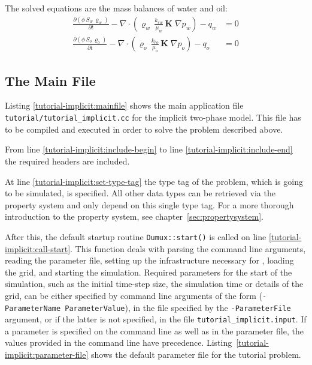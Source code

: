 The solved equations are the mass balances of water and oil:
\begin{align}
  \label{massbalancewater}
  \frac {\partial (\phi \, S_{w}\, \varrho_{w})}{\partial t}
  -
  \nabla \cdot \left( \varrho_{w} \, \frac{k_{rw}}{\mu_{w}} \, \mathbf{K}\;\nabla p_w \right)
  -
  q_w
  & =
  0 \\
  \label{massbalanceoil}
  \frac {\partial (\phi \, S_{o}\, \varrho_{o})}{\partial t}
  -
  \nabla \cdot \left( \varrho_{o} \, \frac{k_{ro}}{\mu_{o}} \, \mathbf{K}\;\nabla p_o \right)
  -
  q_o
  & =
  0
\end{align}

\subsection{The Main File}
Listing \ref{tutorial-implicit:mainfile} shows the main application file
\texttt{tutorial/tutorial\_implicit.cc} for the implicit two-phase
model. This file has to be compiled and executed in order to solve the problem described
above.

\begin{lst}\label{tutorial-implicit:mainfile} \mbox{}
  
\end{lst}

From line \ref{tutorial-implicit:include-begin} to line
\ref{tutorial-implicit:include-end} the required headers are included.

At line \ref{tutorial-implicit:set-type-tag} the type tag of the
problem, which is going to be simulated, is specified. All other data
types can be retrieved via the \Dumux property system and only depend
on this single type tag. For a more thorough introduction to the
\Dumux property system, see chapter~\ref{sec:propertysystem}.

After this, the default startup routine \texttt{Dumux::start()} is
called on line \ref{tutorial-implicit:call-start}. This function deals
with parsing the command line arguments, reading the parameter file,
setting up the infrastructure necessary for \Dune, loading the grid, and
starting the simulation.
Required parameters for the start of the simulation,
such as the initial time-step size, the simulation time or details of the grid,
can be either specified by command line arguments of the form
(\texttt{-ParameterName ParameterValue}), in the file specified by the
\texttt{-ParameterFile} argument, or if the latter is not specified,
in the file \mbox{\texttt{tutorial\_implicit.input}}.
If a parameter is
specified on the command line as well as in the parameter file, the
values provided in the command line have
precedence. Listing~\ref{tutorial-implicit:parameter-file} shows the
default parameter file for the tutorial problem.

